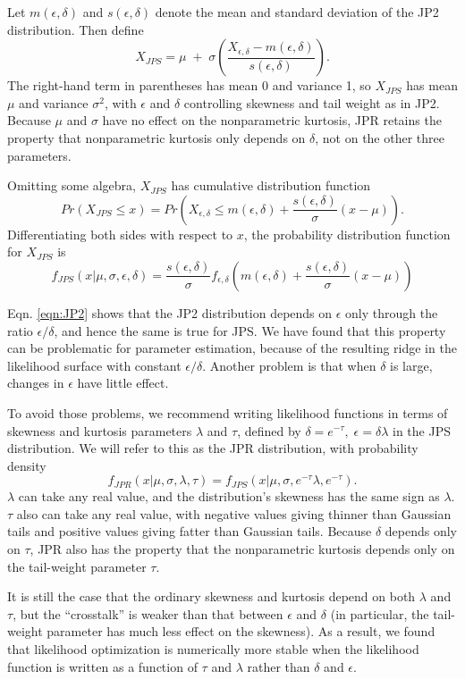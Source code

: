 \documentclass[12pt]{article}
\newcommand{\be}{\begin{equation}}
\newcommand{\ee}{\end{equation}}
\begin{document}
\begin{spacing}{1.35}
	Let $m(\epsilon,\delta)$ and $s(\epsilon, \delta)$ denote the mean and standard deviation of the 
	JP2 distribution. Then define 
	\be  
	X_{JPS} = \mu \; + \; \sigma \left(\frac{X_{\epsilon,\delta} - m(\epsilon,\delta)}{s(\epsilon,\delta)}\right).
	\ee
	The right-hand term in parentheses has mean 0 and variance 1, so 
	$X_{JPS}$ has mean $\mu$ and variance $\sigma^2$, with $\epsilon$ and $\delta$ controlling skewness
	and tail weight as in JP2. Because $\mu$ and $\sigma$ have no effect on the nonparametric kurtosis, 
	JPR retains the property that nonparametric kurtosis only depends on $\delta$, not on the other three parameters. 
	
	Omitting some algebra, $X_{JPS}$ has cumulative distribution function 
	\be
	Pr(X_{JPS} \le x)  = Pr\left(X_{\epsilon,\delta} \le  m(\epsilon,\delta) + \frac{s(\epsilon,\delta)}{\sigma}(x - \mu)\right).
	\ee
	Differentiating both sides with respect to $x$, the probability distribution function for $X_{JPS}$ is 
	\be
	f_{JPS}(x \vert \mu, \sigma, \epsilon, \delta) =  \frac{s(\epsilon,\delta)}{\sigma} 
	f_{ \epsilon,\delta}\left(m(\epsilon,\delta) + \frac{s(\epsilon,\delta)}{\sigma}(x - \mu) \right) 
	\ee
	
	Eqn. \eqref{eqn:JP2} shows that the JP2 distribution depends on $\epsilon$ only through 
	the ratio $\epsilon/\delta$, and hence the same is true for JPS. 
	We have found that this property can be problematic for parameter estimation, 
	because of the resulting ridge in the likelihood surface with constant  
	$\epsilon/\delta$. Another problem is that when $\delta$ is large, changes 
	in $\epsilon$ have little effect. 
	
	To avoid those problems, we recommend writing likelihood functions in terms of 
	skewness and kurtosis parameters $\lambda$ and $\tau$, defined by 
	$\delta = e^{-\tau}, \; \epsilon =  \delta \lambda$ in the 
	JPS distribution. We will refer to this as the JPR distribution, with probability density 
	\be
	f_{JPR}(x \vert \mu, \sigma, \lambda, \tau) = f_{JPS}(x \vert \mu, \sigma, e^{-\tau}\lambda,  e^{-\tau}). 
	\ee
	$\lambda$ can take any real value, and the distribution's skewness has the same sign as $\lambda$. 
	$\tau$ also can take any real value, with negative values giving thinner than Gaussian tails 
	and positive values giving fatter than Gaussian tails. Because $\delta$ depends only on $\tau$, 
	JPR also has the property that the nonparametric kurtosis depends only on the tail-weight parameter $\tau$. 
	
	It is still the case that the ordinary skewness and kurtosis depend on both $\lambda$ and $\tau$, but the
	``crosstalk'' is weaker than that between $\epsilon$ and $\delta$ (in particular, the tail-weight parameter
	has much less effect on the skewness).  
	As a result, we found that likelihood optimization is numerically more stable when the likelihood function is 
	written as a function of $\tau$ and $\lambda$ rather than $\delta$ and $\epsilon$. 
	

\end{spacing}
\end{document}
